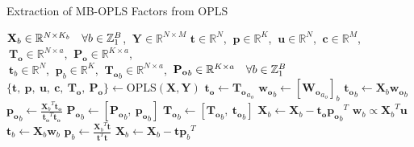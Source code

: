 \begin{algorithm}[H]
\caption{Extraction of MB-OPLS Factors from OPLS}
\label{algorithm.3.7}
\begin{algorithmic}[1]
\REQUIRE $\mathbf{X}_b \in \mathbb{R}^{N \times K_b}
          \quad \forall b \in \mathbb{Z}_{1}^{B}$,%
       $\:\mathbf{Y} \in \mathbb{R}^{N \times M}$
\ENSURE $\mathbf{t} \in \mathbb{R}^N$,%
      $\:\mathbf{p} \in \mathbb{R}^K$,%
      $\:\mathbf{u} \in \mathbb{R}^N$,%
      $\:\mathbf{c} \in \mathbb{R}^M$,%
      $\:\mathbf{T_o} \in \mathbb{R}^{N \times a}$,%
      $\:\mathbf{P_o} \in \mathbb{R}^{K \times a}$, \\
      $\:\mathbf{t}_b \in \mathbb{R}^N$,%
      $\:\mathbf{p}_b \in \mathbb{R}^K$,%
      $\:\mathbf{T_o}_b \in \mathbb{R}^{N \times a}$,%
      $\:\mathbf{P_o}_b \in \mathbb{R}^{K \times a}
       \quad \forall b \in \mathbb{Z}_{1}^{B}$
\STATE $\{\mathbf{t}, \: \mathbf{p}, \: \mathbf{u}, \: \mathbf{c}, \:
        \mathbf{T_o}, \: \mathbf{P_o}\} \gets
        \mathrm{OPLS}(\mathbf{X}, \mathbf{Y})$
    \STATE $\mathbf{t_o} \gets \mathbf{T_o}_{a_o}$ 
    \STATE $\mathbf{w_o}_b \gets [\mathbf{W_o}_{a_o}]_b$ 
    \STATE $\mathbf{t_o}_b \gets \mathbf{X}_b \mathbf{w_o}_b$
    \STATE $\mathbf{p_o}_b \gets
            \tfrac{{\mathbf{X}_b}^T \mathbf{t_o}}
                  {\mathbf{t_o}^T \mathbf{t_o}}$
    \STATE $\mathbf{P_o}_b \gets [\mathbf{P_o}_b, \: \mathbf{p_o}_b]$
    \STATE $\mathbf{T_o}_b \gets [\mathbf{T_o}_b, \: \mathbf{t_o}_b]$
    \STATE $\mathbf{X}_b \gets \mathbf{X}_b - \mathbf{t_o} {\mathbf{p_o}_b}^T$
  \ENDFOR
  \STATE $\mathbf{w}_b \propto {\mathbf{X}_b}^T \mathbf{u}$
  \STATE $\mathbf{t}_b \gets \mathbf{X}_b \mathbf{w}_b$
  \STATE $\mathbf{p}_b \gets
          \tfrac{{\mathbf{X}_b}^T \mathbf{t}}
                {\mathbf{t}^T \mathbf{t}}$
  \STATE $\mathbf{X}_b \gets \mathbf{X}_b - \mathbf{t} {\mathbf{p}_b}^T$
\ENDFOR
\end{algorithmic}
\end{algorithm}

